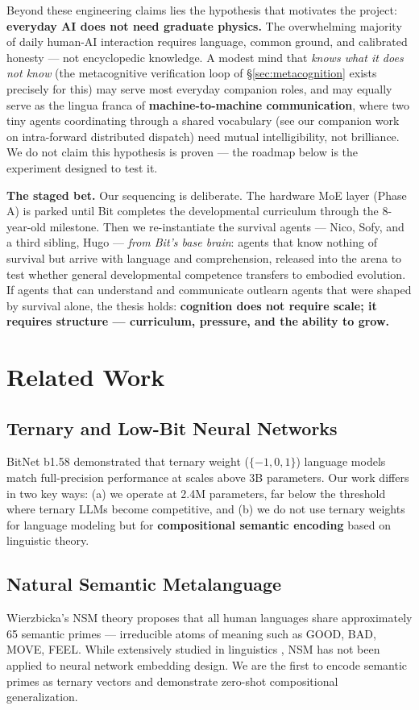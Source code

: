 \documentclass{article}
\begin{document}
Beyond these engineering claims lies the hypothesis that motivates the project: \textbf{everyday AI does not need graduate physics.} The overwhelming majority of daily human-AI interaction requires language, common ground, and calibrated honesty --- not encyclopedic knowledge. A modest mind that \emph{knows what it does not know} (the metacognitive verification loop of \S\ref{sec:metacognition} exists precisely for this) may serve most everyday companion roles, and may equally serve as the lingua franca of \textbf{machine-to-machine communication}, where two tiny agents coordinating through a shared vocabulary (see our companion work on intra-forward distributed dispatch) need mutual intelligibility, not brilliance. We do not claim this hypothesis is proven --- the roadmap below is the experiment designed to test it.

\textbf{The staged bet.} Our sequencing is deliberate. The hardware MoE layer (Phase A) is parked until Bit completes the developmental curriculum through the 8-year-old milestone. Then we re-instantiate the survival agents --- Nico, Sofy, and a third sibling, Hugo --- \emph{from Bit's base brain}: agents that know nothing of survival but arrive with language and comprehension, released into the arena to test whether general developmental competence transfers to embodied evolution. If agents that can understand and communicate outlearn agents that were shaped by survival alone, the thesis holds: \textbf{cognition does not require scale; it requires structure --- curriculum, pressure, and the ability to grow.}

\section{Related Work}

\subsection{Ternary and Low-Bit Neural Networks}
BitNet b1.58 \cite{ma2024era} demonstrated that ternary weight ($\{-1, 0, 1\}$) language models match full-precision performance at scales above 3B parameters. Our work differs in two key ways: (a) we operate at 2.4M parameters, far below the threshold where ternary LLMs become competitive, and (b) we do not use ternary weights for language modeling but for \textbf{compositional semantic encoding} based on linguistic theory.

\subsection{Natural Semantic Metalanguage}
Wierzbicka's NSM theory \cite{wierzbicka1996semantics} proposes that all human languages share approximately 65 semantic primes --- irreducible atoms of meaning such as GOOD, BAD, MOVE, FEEL. While extensively studied in linguistics \cite{goddard2014words, goddard2018ten}, NSM has not been applied to neural network embedding design. We are the first to encode semantic primes as ternary vectors and demonstrate zero-shot compositional generalization.
\end{document}
